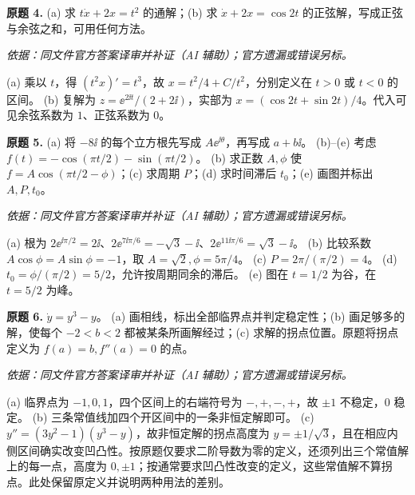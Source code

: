 \begin{exercise}\label{cw:prex1-4}\textbf{原题 4.}
(a) 求 $t\dot x+2x=t^2$ 的通解；(b) 求 $\dot x+2x=\cos2t$ 的正弦解，写成正弦与余弦之和，可用任何方法。
\end{exercise}
\begin{solution}
\textit{依据：同文件官方答案译审并补证（AI 辅助）；官方遗漏或错误另标。}\par
(a) 乘以 $t$，得 $(t^2x)'=t^3$，故 $x=t^2/4+C/t^2$，分别定义在 $t>0$ 或 $t<0$ 的区间。
(b) 复解为 $z=\ee^{2\ii t}/(2+2\ii)$，实部为 $x=(\cos2t+\sin2t)/4$。代入可见余弦系数为 $1$、正弦系数为 $0$。
\end{solution}
\begin{exercise}\label{cw:prex1-5}\textbf{原题 5.}
(a) 将 $-8\ii$ 的每个立方根先写成 $A\ee^{\ii\theta}$，再写成 $a+b\ii$。
(b)--(e) 考虑 $f(t)=-\cos(\pi t/2)-\sin(\pi t/2)$。
(b) 求正数 $A,\phi$ 使 $f=A\cos(\pi t/2-\phi)$；(c) 求周期 $P$；(d) 求时间滞后 $t_0$；(e) 画图并标出 $A,P,t_0$。
\end{exercise}
\begin{solution}
\textit{依据：同文件官方答案译审并补证（AI 辅助）；官方遗漏或错误另标。}\par
(a) 根为 $2\ee^{\ii\pi/2}=2\ii$、$2\ee^{7\ii\pi/6}=-\sqrt3-\ii$、$2\ee^{11\ii\pi/6}=\sqrt3-\ii$。
(b) 比较系数 $A\cos\phi=A\sin\phi=-1$，取 $A=\sqrt2,\phi=5\pi/4$。
(c) $P=2\pi/(\pi/2)=4$。
(d) $t_0=\phi/(\pi/2)=5/2$，允许按周期同余的滞后。
(e) 图在 $t=1/2$ 为谷，在 $t=5/2$ 为峰。
\begin{center}\end{center}
\end{solution}
\begin{exercise}\label{cw:prex1-6}\textbf{原题 6.} $\dot y=y^3-y$。
(a) 画相线，标出全部临界点并判定稳定性；(b) 画足够多的解，使每个 $-2<b<2$ 都被某条所画解经过；(c) 求解的拐点位置。原题将拐点定义为 $f(a)=b,f''(a)=0$ 的点。
\end{exercise}
\begin{solution}
\textit{依据：同文件官方答案译审并补证（AI 辅助）；官方遗漏或错误另标。}\par
(a) 临界点为 $-1,0,1$，四个区间上的右端符号为 $-,+,-,+$，故 $\pm1$ 不稳定，$0$ 稳定。
(b) 三条常值线加四个开区间中的一条非恒定解即可。\ODEExamCubicPhase
(c) $y''=(3y^2-1)(y^3-y)$，故非恒定解的拐点高度为 $y=\pm1/\sqrt3$，且在相应内侧区间确实改变凹凸性。按原题仅要求二阶导数为零的定义，还须列出三个常值解上的每一点，高度为 $0,\pm1$；按通常要求凹凸性改变的定义，这些常值解不算拐点。此处保留原定义并说明两种用法的差别。
\end{solution}

